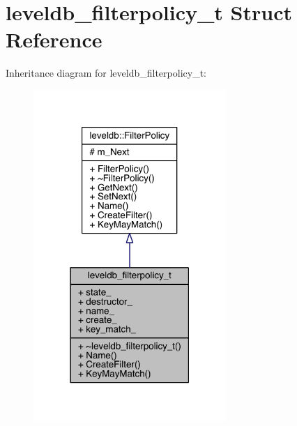 \hypertarget{structleveldb__filterpolicy__t}{}\section{leveldb\+\_\+filterpolicy\+\_\+t Struct Reference}
\label{structleveldb__filterpolicy__t}


Inheritance diagram for leveldb\+\_\+filterpolicy\+\_\+t\+:\nopagebreak
\begin{figure}[H]
\begin{center}
\leavevmode
\includegraphics[width=207pt]{structleveldb__filterpolicy__t__inherit__graph}
\end{center}
\end{figure}


